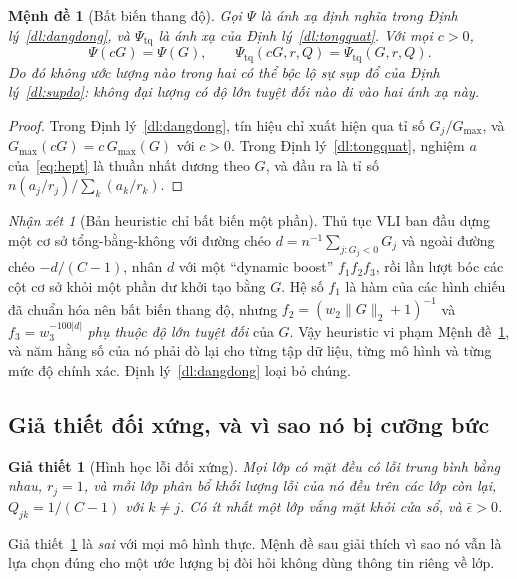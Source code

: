 \documentclass[11pt]{article}
\newtheorem{menhde}[dinhly]{Mệnh đề}
\newtheorem{giathiet}[dinhly]{Giả thiết}
\theoremstyle{remark}
\newtheorem{nhanxet}[dinhly]{Nhận xét}
\begin{document}
\begin{menhde}[Bất biến thang độ]
\label{md:batbien}
Gọi $\Psi$ là ánh xạ định nghĩa trong Định lý~\ref{dl:dangdong}, và
$\Psi_{\mathrm{tq}}$ là ánh xạ của Định lý~\ref{dl:tongquat}. Với mọi $c>0$,
\[
 \Psi(cG) = \Psi(G), \qquad
 \Psi_{\mathrm{tq}}(cG, r, Q) = \Psi_{\mathrm{tq}}(G,r,Q) .
\]
Do đó không ước lượng nào trong hai có thể bộc lộ sự sụp đổ của
Định lý~\ref{dl:supdo}: không đại lượng có độ lớn tuyệt đối nào đi vào hai
ánh xạ này.
\end{menhde}

\begin{proof}
Trong Định lý~\ref{dl:dangdong}, tín hiệu chỉ xuất hiện qua tỉ số
$G_j/G_{\max}$, và $G_{\max}(cG) = c\,G_{\max}(G)$ với $c>0$. Trong
Định lý~\ref{dl:tongquat}, nghiệm $a$ của~\eqref{eq:hept} là thuần nhất dương
theo $G$, và đầu ra là tỉ số $n(a_j/r_j)/\sum_k (a_k/r_k)$.
\end{proof}

\begin{nhanxet}[Bản heuristic chỉ bất biến một phần]
Thủ tục VLI ban đầu dựng một cơ sở tổng-bằng-không với đường chéo
$d = n^{-1}\sum_{j:G_j<0}G_j$ và ngoài đường chéo $-d/(C-1)$, nhân $d$ với
một ``dynamic boost'' $f_1 f_2 f_3$, rồi lần lượt bóc các cột cơ sở khỏi một
phần dư khởi tạo bằng $G$. Hệ số $f_1$ là hàm của các hình chiếu đã chuẩn hóa
nên bất biến thang độ, nhưng $f_2 = (w_2\|G\|_2+1)^{-1}$ và
$f_3 = w_3^{-100|d|}$ \emph{phụ thuộc độ lớn tuyệt đối} của $G$. Vậy
heuristic vi phạm Mệnh đề~\ref{md:batbien}, và năm hằng số của nó phải dò lại
cho từng tập dữ liệu, từng mô hình và từng mức độ chính xác.
Định lý~\ref{dl:dangdong} loại bỏ chúng.
\end{nhanxet}

\subsection{Giả thiết đối xứng, và vì sao nó bị cưỡng bức}

\begin{giathiet}[Hình học lỗi đối xứng]
\label{gt:doixung}
Mọi lớp có mặt đều có lỗi trung bình bằng nhau, $r_j = 1$, và mỗi lớp phân bổ
khối lượng lỗi của nó đều trên các lớp còn lại,
$Q_{jk} = 1/(C-1)$ với $k \ne j$. Có ít nhất một lớp vắng mặt khỏi cửa sổ, và
$\bar\epsilon > 0$.
\end{giathiet}

Giả thiết~\ref{gt:doixung} là \emph{sai} với mọi mô hình thực. Mệnh đề sau
giải thích vì sao nó vẫn là lựa chọn đúng cho một ước lượng bị đòi hỏi không
dùng thông tin riêng về lớp.
\end{document}
